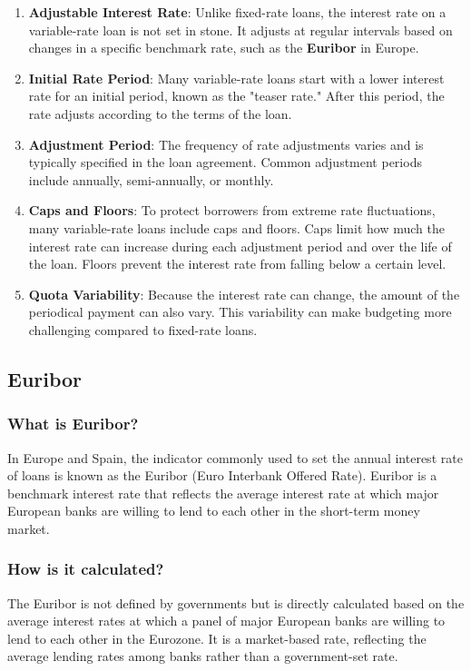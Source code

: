 \documentclass{article}
\begin{document}
\begin{enumerate}
    \item \textbf{Adjustable Interest Rate}: Unlike fixed-rate loans, the interest rate on a variable-rate loan is not set in stone. It adjusts at regular intervals based on changes in a specific benchmark rate, such as the \textbf{Euribor} in Europe.
    \item \textbf{Initial Rate Period}: Many variable-rate loans start with a lower interest rate for an initial period, known as the "teaser rate." After this period, the rate adjusts according to the terms of the loan.
    \item \textbf{Adjustment Period}: The frequency of rate adjustments varies and is typically specified in the loan agreement. Common adjustment periods include annually, semi-annually, or monthly.
    \item \textbf{Caps and Floors}: To protect borrowers from extreme rate fluctuations, many variable-rate loans include caps and floors. Caps limit how much the interest rate can increase during each adjustment period and over the life of the loan. Floors prevent the interest rate from falling below a certain level.
    \item \textbf{Quota Variability}: Because the interest rate can change, the amount of the periodical payment can also vary. This variability can make budgeting more challenging compared to fixed-rate loans.
\end{enumerate}


\subsection{Euribor}
\subsubsection{What is Euribor?}

In Europe and Spain, the indicator commonly used to set the annual interest rate of loans is known as the Euribor (Euro Interbank Offered Rate). Euribor is a benchmark interest rate that reflects the average interest rate at which major European banks are willing to lend to each other in the short-term money market.

\subsubsection{How is it calculated?}
The Euribor is not defined by governments but is directly calculated based on the average interest rates at which a panel of major European banks are willing to lend to each other in the Eurozone.
It is a market-based rate, reflecting the average lending rates among banks rather than a government-set rate.
\end{document}
